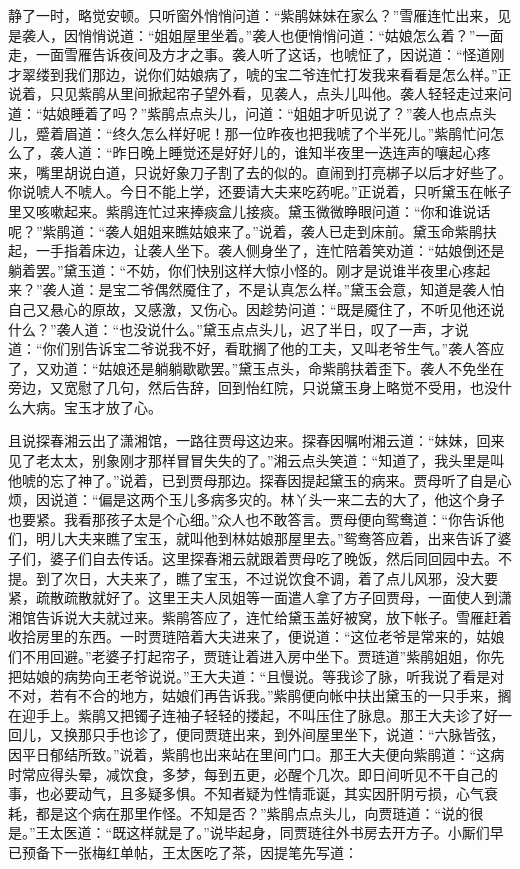 \begin{parag}
    静了一时，略觉安顿。只听窗外悄悄问道：“紫鹃妹妹在家么？”雪雁连忙出来，见是袭人，因悄悄说道：“姐姐屋里坐着。”袭人也便悄悄问道：“姑娘怎么着？”一面走，一面雪雁告诉夜间及方才之事。袭人听了这话，也唬怔了，因说道：“怪道刚才翠缕到我们那边，说你们姑娘病了，唬的宝二爷连忙打发我来看看是怎么样。”正说着，只见紫鹃从里间掀起帘子望外看，见袭人，点头儿叫他。袭人轻轻走过来问道：“姑娘睡着了吗？”紫鹃点点头儿，问道：“姐姐才听见说了？”袭人也点点头儿，蹙着眉道：“终久怎么样好呢！那一位昨夜也把我唬了个半死儿。”紫鹃忙问怎么了，袭人道：“昨日晚上睡觉还是好好儿的，谁知半夜里一迭连声的嚷起心疼来，嘴里胡说白道，只说好象刀子割了去的似的。直闹到打亮梆子以后才好些了。你说唬人不唬人。今日不能上学，还要请大夫来吃药呢。”正说着，只听黛玉在帐子里又咳嗽起来。紫鹃连忙过来捧痰盒儿接痰。黛玉微微睁眼问道：“你和谁说话呢？”紫鹃道：“袭人姐姐来瞧姑娘来了。”说着，袭人已走到床前。黛玉命紫鹃扶起，一手指着床边，让袭人坐下。袭人侧身坐了，连忙陪着笑劝道：“姑娘倒还是躺着罢。”黛玉道：“不妨，你们快别这样大惊小怪的。刚才是说谁半夜里心疼起来？”袭人道：是宝二爷偶然魇住了，不是认真怎么样。”黛玉会意，知道是袭人怕自己又悬心的原故，又感激，又伤心。因趁势问道：“既是魇住了，不听见他还说什么？”袭人道：“也没说什么。”黛玉点点头儿，迟了半日，叹了一声，才说道：“你们别告诉宝二爷说我不好，看耽搁了他的工夫，又叫老爷生气。”袭人答应了，又劝道：“姑娘还是躺躺歇歇罢。”黛玉点头，命紫鹃扶着歪下。袭人不免坐在旁边，又宽慰了几句，然后告辞，回到怡红院，只说黛玉身上略觉不受用，也没什么大病。宝玉才放了心。
\end{parag}


\begin{parag}
    且说探春湘云出了潇湘馆，一路往贾母这边来。探春因嘱咐湘云道：“妹妹，回来见了老太太，别象刚才那样冒冒失失的了。”湘云点头笑道：“知道了，我头里是叫他唬的忘了神了。”说着，已到贾母那边。探春因提起黛玉的病来。贾母听了自是心烦，因说道：“偏是这两个玉儿多病多灾的。林丫头一来二去的大了，他这个身子也要紧。我看那孩子太是个心细。”众人也不敢答言。贾母便向鸳鸯道：“你告诉他们，明儿大夫来瞧了宝玉，就叫他到林姑娘那屋里去。”鸳鸯答应着，出来告诉了婆子们，婆子们自去传话。这里探春湘云就跟着贾母吃了晚饭，然后同回园中去。不提。到了次日，大夫来了，瞧了宝玉，不过说饮食不调，着了点儿风邪，没大要紧，疏散疏散就好了。这里王夫人凤姐等一面遣人拿了方子回贾母，一面使人到潇湘馆告诉说大夫就过来。紫鹃答应了，连忙给黛玉盖好被窝，放下帐子。雪雁赶着收拾房里的东西。一时贾琏陪着大夫进来了，便说道：“这位老爷是常来的，姑娘们不用回避。”老婆子打起帘子，贾琏让着进入房中坐下。贾琏道”紫鹃姐姐，你先把姑娘的病势向王老爷说说。”王大夫道：“且慢说。等我诊了脉，听我说了看是对不对，若有不合的地方，姑娘们再告诉我。”紫鹃便向帐中扶出黛玉的一只手来，搁在迎手上。紫鹃又把镯子连袖子轻轻的搂起，不叫压住了脉息。那王大夫诊了好一回儿，又换那只手也诊了，便同贾琏出来，到外间屋里坐下，说道：“六脉皆弦，因平日郁结所致。”说着，紫鹃也出来站在里间门口。那王大夫便向紫鹃道：“这病时常应得头晕，减饮食，多梦，每到五更，必醒个几次。即日间听见不干自己的事，也必要动气，且多疑多惧。不知者疑为性情乖诞，其实因肝阴亏损，心气衰耗，都是这个病在那里作怪。不知是否？”紫鹃点点头儿，向贾琏道：“说的很是。”王太医道：“既这样就是了。”说毕起身，同贾琏往外书房去开方子。小厮们早已预备下一张梅红单帖，王太医吃了茶，因提笔先写道：
\end{parag}


